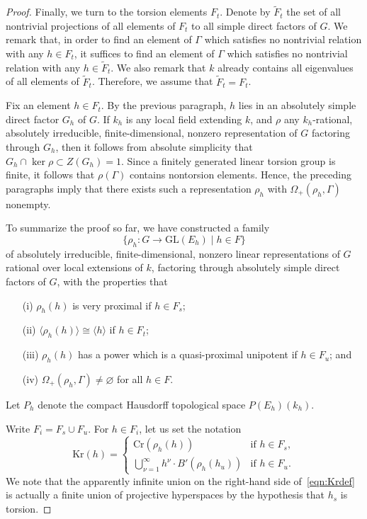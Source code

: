 \documentclass{amsart}
\theoremstyle{plain}
\theoremstyle{definition}
\theoremstyle{remark}
\begin{document}
\begin{proof}
Finally, we turn to the torsion elements $F_{t}$. Denote by $\widetilde{F}_{t}$ the set
of all nontrivial projections of all elements of $F_{t}$ to all simple direct factors of
$G$. We remark that, in order to find an element of $\Gamma$ which satisfies no
nontrivial relation with any $h \in F_{t}$, it suffices to find an element of $\Gamma$ which satisfies no
nontrivial relation with any $h \in \widetilde{F}_{t}$. We also remark that $k$ already
contains all eigenvalues of all elements of $\widetilde{F}_{t}$. Therefore, we assume
that $\widetilde{F}_{t} = F_{t}$.

Fix an element $h \in F_{t}$. By the previous paragraph, $h$ lies in an absolutely
simple direct factor $G_{h}$ of $G$.
If $k_{h}$ is any local field extending $k$, and $\rho$
any $k_{h}$-rational, absolutely irreducible, finite-dimensional, nonzero representation of
$G$ factoring through $G_{h}$, then it follows from absolute simplicity that $G_{h} \cap
\ker \rho \subset Z(G_{h}) = 1$. Since a
finitely generated linear torsion group is finite, it follows that $\rho(\Gamma)$
contains nontorsion elements. Hence, the preceding paragraphs imply that there exists
such a representation $\rho_{h}$ with $\Omega_{+}(\rho_{h}, \Gamma)$ nonempty.
 
To summarize the proof so far, we have constructed a family $$\{\rho_{h}: G \to
\mathrm{GL}(E_{h})\mid h
\in F\}$$ of absolutely irreducible, finite-dimensional, nonzero linear representations of
$G$ rational over local extensions of $k$, factoring through absolutely simple direct
factors of $G$,
with the properties that
\begin{itemize}
\item[(i)] $\rho_{h}(h)$ is very proximal if $h \in F_{s}$;
\item[(ii)] $\langle\rho_{h}(h)\rangle \cong \langle h\rangle$ if
$h
\in F_{t}$;
\item[(iii)] $\rho_{h}(h)$ has a power which is a quasi-proximal unipotent if $h \in
F_{u}$; and
\item[(iv)] $\Omega_{+}(\rho_{h}, \Gamma) \neq \varnothing$ for all $h \in F$.
\end{itemize}
Let $P_{h}$ denote the compact Hausdorff topological space $P(E_{h})(k_{h})$.

Write $F_{i} = F_{s} \cup F_{u}$. For $h \in F_{i}$,
let us set the notation
\begin{equation}
\label{eqn:Krdef}
\mathrm{Kr}(h) = \begin{cases}
\mathrm{Cr}(\rho_{h}(h))& \text{if $h \in F_{s}$},\\
\bigcup_{\nu = 1}^{\infty}h^{\nu}\cdot B'(\rho_{h}(h_{u}))& \text{if $h \in F_{u}$}.
\end{cases}
\end{equation}
We note that the apparently infinite union on the right-hand side of~\eqref{eqn:Krdef}
is actually a finite union of projective hyperspaces by the hypothesis that $h_{s}$ is
torsion.


\end{proof}
\end{document}
